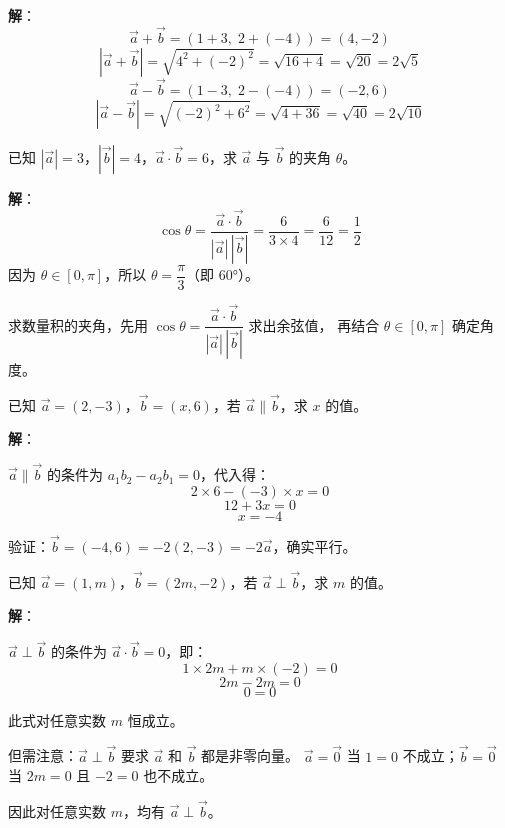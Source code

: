 \documentclass[12pt, a4paper]{ctexart}
\begin{document}
\textbf{解}：
\[
\vec{a}+\vec{b} = (1+3,\; 2+(-4)) = (4,-2)
\]
\[
|\vec{a}+\vec{b}| = \sqrt{4^2+(-2)^2} = \sqrt{16+4} = \sqrt{20} = 2\sqrt{5}
\]
\[
\vec{a}-\vec{b} = (1-3,\; 2-(-4)) = (-2,6)
\]
\[
|\vec{a}-\vec{b}| = \sqrt{(-2)^2+6^2} = \sqrt{4+36} = \sqrt{40} = 2\sqrt{10}
\]

\begin{examplebox}[【例题3】数量积与夹角计算]
已知 $|\vec{a}|=3$，$|\vec{b}|=4$，$\vec{a}\cdot\vec{b}=6$，求 $\vec{a}$ 与 $\vec{b}$ 的夹角 $\theta$。
\end{examplebox}

\textbf{解}：
\[
\cos\theta = \frac{\vec{a}\cdot\vec{b}}{|\vec{a}|\,|\vec{b}|}
= \frac{6}{3\times4} = \frac{6}{12} = \frac{1}{2}
\]
因为 $\theta \in [0,\pi]$，所以 $\theta = \dfrac{\pi}{3}$（即 $60°$）。

\begin{tipbox}[方法总结]
求数量积的夹角，先用 $\cos\theta = \dfrac{\vec{a}\cdot\vec{b}}{|\vec{a}|\,|\vec{b}|}$ 求出余弦值，
再结合 $\theta \in [0,\pi]$ 确定角度。
\end{tipbox}

\begin{examplebox}[【例题4】向量平行的判定]
已知 $\vec{a}=(2,-3)$，$\vec{b}=(x,6)$，若 $\vec{a} \parallel \vec{b}$，求 $x$ 的值。
\end{examplebox}

\textbf{解}：

$\vec{a} \parallel \vec{b}$ 的条件为 $a_1 b_2 - a_2 b_1 = 0$，代入得：
\[
2 \times 6 - (-3) \times x = 0
\]
\[
12 + 3x = 0
\]
\[
x = -4
\]

验证：$\vec{b}=(-4,6)=-2(2,-3)=-2\vec{a}$，确实平行。

\begin{examplebox}[【例题5】向量垂直的判定]
已知 $\vec{a}=(1,m)$，$\vec{b}=(2m, -2)$，若 $\vec{a} \perp \vec{b}$，求 $m$ 的值。
\end{examplebox}

\textbf{解}：

$\vec{a} \perp \vec{b}$ 的条件为 $\vec{a}\cdot\vec{b} = 0$，即：
\[
1 \times 2m + m \times (-2) = 0
\]
\[
2m - 2m = 0
\]
\[
0 = 0
\]

此式对任意实数 $m$ 恒成立。

但需注意：$\vec{a} \perp \vec{b}$ 要求 $\vec{a}$ 和 $\vec{b}$ 都是非零向量。
$\vec{a}=\vec{0}$ 当 $1=0$ 不成立；$\vec{b}=\vec{0}$ 当 $2m=0$ 且 $-2=0$ 也不成立。

因此对任意实数 $m$，均有 $\vec{a} \perp \vec{b}$。
\end{document}

